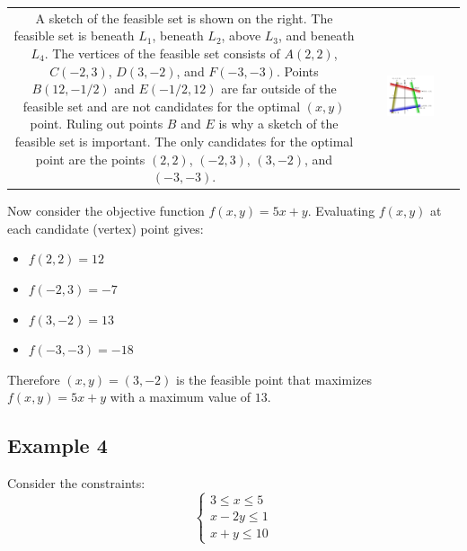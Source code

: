 \documentclass{article}
\begin{document}
\begin{tabular}{cc}
\parbox{0.45\textwidth}{
A sketch of the feasible set is shown on the right. The feasible set is beneath \(L_1\), beneath \(L_2\), above \(L_3\), and beneath \(L_4\). The vertices of the feasible set consists of \(A(2,2)\), \(C(-2,3)\), \(D(3,-2)\), and \(F(-3,-3)\). Points \(B(12,-1/2)\) and \(E(-1/2,12)\) are far outside of the feasible set and are not candidates for the optimal \((x, y)\) point. Ruling out points \(B\) and \(E\) is why a sketch of the feasible set is important. The only candidates for the optimal point are the points \((2,2)\), \((-2,3)\), \((3,-2)\), and \((-3,-3)\). 
} & \parbox{0.55\textwidth}{
\includegraphics[width = 0.55\textwidth]{feasible_set_3}
}
\end{tabular}

Now consider the objective function \(f(x, y) = 5x + y\). Evaluating \(f(x, y)\) at each candidate (vertex) point gives:
\begin{itemize}
\item \(f(2,2) = 12\)
\item \(f(-2,3) = -7\)
\item \(f(3,-2) = 13\)
\item \(f(-3,-3) = -18\)
\end{itemize} 
Therefore \((x, y) = (3,-2)\) is the feasible point that maximizes \(f(x, y) = 5x + y\) with a maximum value of \(13\).

 


\subsection*{Example 4}

Consider the constraints:
\[\left\{\begin{array}{c}
3 \leq x \leq 5 \\
x - 2y \leq 1 \\
x + y \leq 10
\end{array}\right.\]
\end{document}
